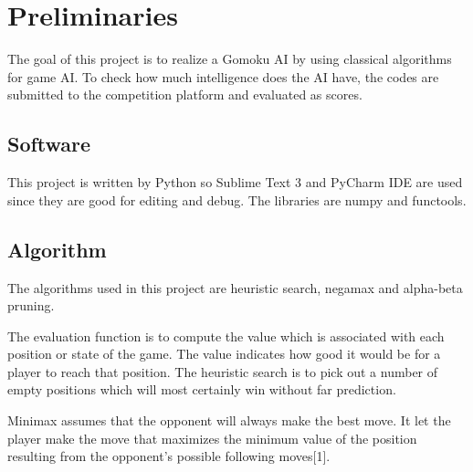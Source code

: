 \documentclass[conference,compsoc]{IEEEtran}
\begin{document}
\maketitle







%
\IEEEpeerreviewmaketitle



\section{Preliminaries}
The goal of this project is to realize a Gomoku AI by using classical algorithms for game AI. To check how much intelligence does the AI have, the codes are submitted to the competition platform and evaluated as scores.
\subsection{Software}
This project is written by Python so Sublime Text 3 and PyCharm IDE are used since they are good for editing and debug. The libraries are numpy and functools.
\subsection{Algorithm}
The algorithms used in this project are heuristic search, negamax and alpha-beta pruning.  

The evaluation function is to compute the value which is associated with each position or state of the game. The value indicates how good it would be for a player to reach that position. The heuristic search is to pick out a number of empty positions which will most certainly win without far prediction. 

Minimax assumes that the opponent will always make the best move. It let the player make the move that maximizes the minimum value of the position resulting from the opponent's
possible following moves[1]. 
\end{document}
